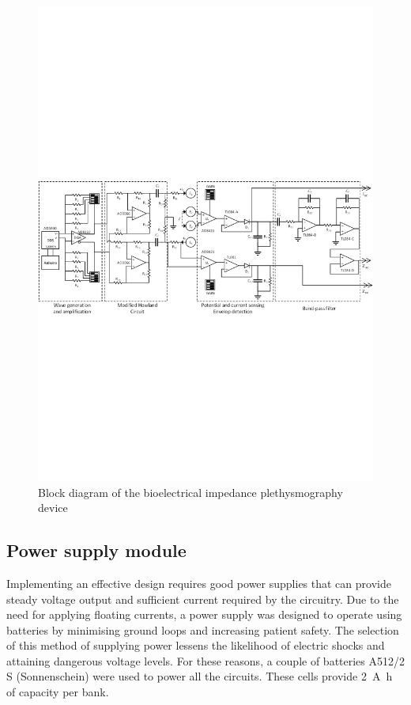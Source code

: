 \begin{landscape}\centering
	\vspace*{\fill}
	\begin{figure}[!htp]
		\includegraphics[height=0.59\textheight,keepaspectratio]{figure2}
		\caption{Block diagram of the bioelectrical impedance plethysmography device}
		\label{fig:block}
	\end{figure}
	\vspace*{\fill}
\end{landscape}

\subsection{Power supply module}
\label{section design battery}
Implementing an effective design requires good power supplies that can provide steady voltage output and sufficient current required by the circuitry. Due to the need for applying floating currents, a power supply was designed to operate using batteries by minimising ground loops and increasing patient safety.  The selection of this method of supplying power lessens the likelihood of electric shocks and attaining dangerous voltage levels. For these reasons, a couple of batteries A512/2 S (Sonnenschein) were used to power all the circuits. These cells provide \SI{2}{\ampere\hour} of capacity per bank.

